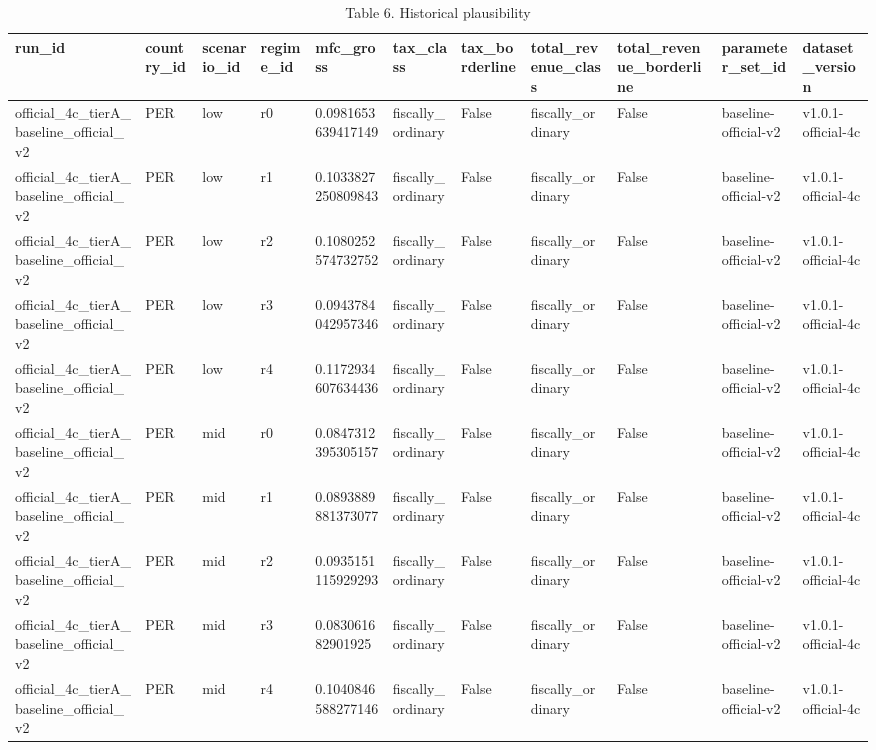 \begin{table}[!htbp]
\centering
\caption{Table 6. Historical plausibility}
\begin{tabular}{lllllllllll}
\toprule
run\_id & country\_id & scenario\_id & regime\_id & mfc\_gross & tax\_class & tax\_borderline & total\_revenue\_class & total\_revenue\_borderline & parameter\_set\_id & dataset\_version \\
\midrule
official\_4c\_tierA\_baseline\_official\_v2 & PER & low & r0 & 0.0981653639417149 & fiscally\_ordinary & False & fiscally\_ordinary & False & baseline-official-v2 & v1.0.1-official-4c \\
official\_4c\_tierA\_baseline\_official\_v2 & PER & low & r1 & 0.1033827250809843 & fiscally\_ordinary & False & fiscally\_ordinary & False & baseline-official-v2 & v1.0.1-official-4c \\
official\_4c\_tierA\_baseline\_official\_v2 & PER & low & r2 & 0.1080252574732752 & fiscally\_ordinary & False & fiscally\_ordinary & False & baseline-official-v2 & v1.0.1-official-4c \\
official\_4c\_tierA\_baseline\_official\_v2 & PER & low & r3 & 0.0943784042957346 & fiscally\_ordinary & False & fiscally\_ordinary & False & baseline-official-v2 & v1.0.1-official-4c \\
official\_4c\_tierA\_baseline\_official\_v2 & PER & low & r4 & 0.1172934607634436 & fiscally\_ordinary & False & fiscally\_ordinary & False & baseline-official-v2 & v1.0.1-official-4c \\
official\_4c\_tierA\_baseline\_official\_v2 & PER & mid & r0 & 0.0847312395305157 & fiscally\_ordinary & False & fiscally\_ordinary & False & baseline-official-v2 & v1.0.1-official-4c \\
official\_4c\_tierA\_baseline\_official\_v2 & PER & mid & r1 & 0.0893889881373077 & fiscally\_ordinary & False & fiscally\_ordinary & False & baseline-official-v2 & v1.0.1-official-4c \\
official\_4c\_tierA\_baseline\_official\_v2 & PER & mid & r2 & 0.0935151115929293 & fiscally\_ordinary & False & fiscally\_ordinary & False & baseline-official-v2 & v1.0.1-official-4c \\
official\_4c\_tierA\_baseline\_official\_v2 & PER & mid & r3 & 0.083061682901925 & fiscally\_ordinary & False & fiscally\_ordinary & False & baseline-official-v2 & v1.0.1-official-4c \\
official\_4c\_tierA\_baseline\_official\_v2 & PER & mid & r4 & 0.1040846588277146 & fiscally\_ordinary & False & fiscally\_ordinary & False & baseline-official-v2 & v1.0.1-official-4c \\

\end{tabular}
\end{table}
